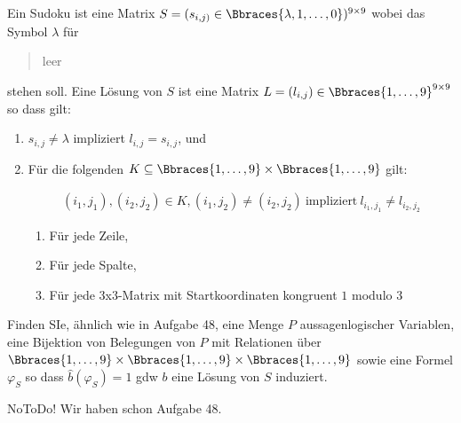 
\begin{exercise}[49]

Ein Sudoku ist eine Matrix $S = (s_{i, j)} \in \Bbraces{\lambda, 1, \dots, 0})^{9 \times 9}$ wobei das Symbol $\lambda$ für \blockquote{leer} stehen soll.
Eine Lösung von $S$ ist eine Matrix $L = (l_{i, j}) \in \Bbraces{1, \dots, 9}^{9 \times 9}$ so dass gilt:

\begin{enumerate}[label = \arabic*.]

    \item $s_{i, j} \neq \lambda$ impliziert $l_{i, j} = s_{i, j}$, und
    
    \item Für die folgenden $K \subseteq \Bbraces{1, \dots, 9} \times \Bbraces{1, \dots, 9}$ gilt:
    
    \begin{align*}
        (i_1, j_1), (i_2, j_2) \in K,
        (i_1, j_2) \neq (i_2, j_2)
        ~\text{impliziert}~
        l_{i_1, j_1} \neq l_{i_2, j_2}
    \end{align*}

    \begin{enumerate}
        \item Für jede Zeile,
        \item Für jede Spalte,
        \item Für jede 3x3-Matrix mit Startkoordinaten kongruent $1$ modulo $3$
    \end{enumerate}

\end{enumerate}

Finden SIe, ähnlich wie in Aufgabe 48, eine Menge $P$ aussagenlogischer Variablen, eine Bijektion von Belegungen von $P$ mit Relationen über $\Bbraces{1, \dots, 9} \times \Bbraces{1, \dots, 9} \times \Bbraces{1, \dots, 9}$ sowie eine Formel $\varphi_S$ so dass $\hat{b}(\varphi_S) = 1$ gdw $b$ eine Lösung von $S$ induziert.

\end{exercise}


\begin{solution}

NoToDo!
Wir haben schon Aufgabe 48.

\end{solution}

